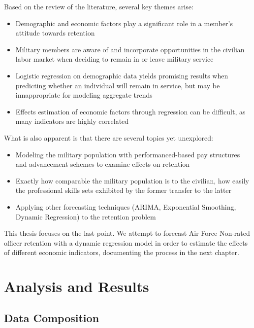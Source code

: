 \documentclass[12pt,letterpaper,toc=flat,oneside]{report}
\providecommand{\tightlist}{%
\setlength{\itemsep}{0pt}\setlength{\parskip}{0pt}}
\theoremstyle{definition}
\theoremstyle{definition}
\theoremstyle{definition}
\theoremstyle{remark}
\begin{document}
Based on the review of the literature, several key themes arise:

\begin{itemize}
\tightlist
\item
  Demographic and economic factors play a significant role in a member's
  attitude towards retention
\item
  Military members are aware of and incorporate opportunities in the
  civilian labor market when deciding to remain in or leave military
  service
\item
  Logistic regression on demographic data yields promising results when
  predicting whether an individual will remain in service, but may be
  innappropriate for modeling aggregate trends
\item
  Effects estimation of economic factors through regression can be
  difficult, as many indicators are highly correlated
\end{itemize}

What is also apparent is that there are several topics yet unexplored:

\begin{itemize}
\tightlist
\item
  Modeling the military population with performanced-based pay
  structures and advancement schemes to examine effects on retention
\item
  Exactly how comparable the military population is to the civilian, how
  easily the professional skills sets exhibited by the former transfer
  to the latter
\item
  Applying other forecasting techniques (ARIMA, Exponential Smoothing,
  Dynamic Regression) to the retention problem
\end{itemize}

This thesis focuses on the last point. We attempt to forecast Air Force
Non-rated officer retention with a dynamic regression model in order to
estimate the effects of different economic indicators, documenting the
process in the next chapter.

\newpage

\hypertarget{analysis-and-results}{%
\chapter{Analysis and Results}\label{analysis-and-results}}

\hypertarget{data-composition}{%
\section{Data Composition}\label{data-composition}}
\end{document}
